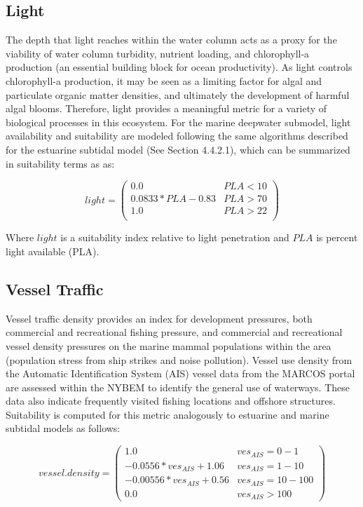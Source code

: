 \documentclass[
]{book}
\begin{document}
\hypertarget{light-1}{%
\subsection{Light}\label{light-1}}

The depth that light reaches within the water column acts as a proxy for the viability of water column turbidity, nutrient loading, and chlorophyll-a production (an essential building block for ocean productivity). As light controls chlorophyll-a production, it may be seen as a limiting factor for algal and particulate organic matter densities, and ultimately the development of harmful algal blooms. Therefore, light provides a meaningful metric for a variety of biological processes in this ecosystem. For the marine deepwater submodel, light availability and suitability are modeled following the same algorithms described for the estuarine subtidal model (See Section 4.4.2.1), which can be summarized in suitability terms as as:

\[light = \begin{pmatrix} 0.0 & PLA<10\\
0.0833*PLA-0.83 & PLA>70\\
1.0 & PLA>22\\
\end{pmatrix}\]

Where \(light\) is a suitability index relative to light penetration and \(PLA\) is percent light available (PLA).

\hypertarget{vessel-traffic}{%
\subsection{Vessel Traffic}\label{vessel-traffic}}

Vessel traffic density provides an index for development pressures, both commercial and recreational fishing pressure, and commercial and recreational vessel density pressures on the marine mammal populations within the area (population stress from ship strikes and noise pollution). Vessel use density from the Automatic Identification System (AIS) vessel data from the MARCOS portal are assessed within the NYBEM to identify the general use of waterways. These data also indicate frequently visited fishing locations and offshore structures. Suitability is computed for this metric analogously to estuarine and marine subtidal models as follows:

\[vessel.density = \begin{pmatrix} 1.0 & ves_{AIS}=0-1\\
-0.0556*ves_{AIS}+1.06 & ves_{AIS}=1-10\\
-0.00556*ves_{AIS}+0.56 & ves_{AIS}=10-100\\
0.0 & ves_{AIS}>100
\end{pmatrix}\]
\end{document}
